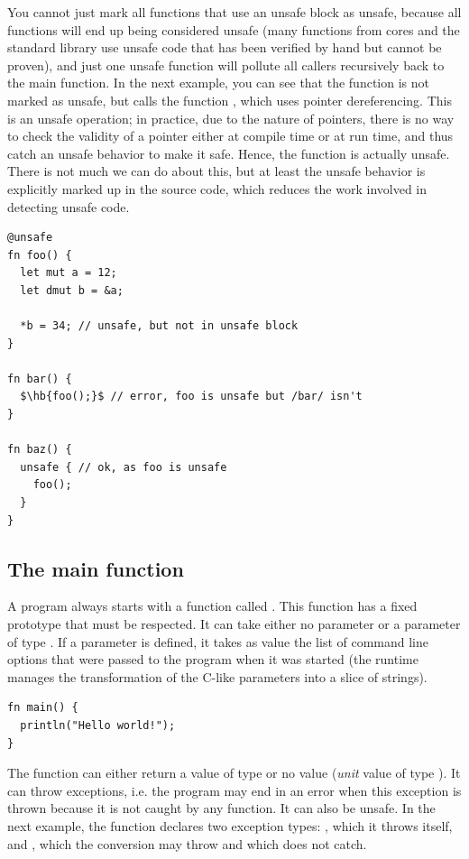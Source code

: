 You cannot just mark all functions that use an unsafe block as unsafe, because
all functions will end up being considered unsafe (many functions from cores and
the standard library use unsafe code that has been verified by hand but cannot
be proven), and just one unsafe function will pollute all callers recursively
back to the main function. In the next example, you can see that the function
 is not marked as unsafe, but calls the function , which
uses pointer dereferencing. This is an unsafe operation; in practice, due to the
nature of pointers, there is no way to check the validity of a pointer either at
compile time or at run time, and thus catch an unsafe behavior to make it safe.
Hence, the  function is actually unsafe. There is not much we can do
about this, but at least the unsafe behavior is explicitly marked up in the
source code, which reduces the work involved in detecting unsafe code.

\begin{lstlisting}[style=coloredverbatimError, escapechar=$]
@unsafe
fn foo() {
  let mut a = 12;
  let dmut b = &a;

  *b = 34; // unsafe, but not in unsafe block
}

fn bar() {
  $\hb{foo();}$ // error, foo is unsafe but /bar/ isn't
}

fn baz() {
  unsafe { // ok, as foo is unsafe
    foo();
  }
}
\end{lstlisting}

\subsection{The main function}

A program always starts with a function called . This function has
a fixed prototype that must be respected. It can take either no parameter or a
parameter of type \token{[[c8]]}. If a parameter is defined, it takes as value
the list of command line options that were passed to the program when it was
started (the runtime manages the transformation of the C-like parameters
 into a slice of strings).

\begin{lstlisting}[style=coloredverbatim, caption=The simplest main function prototype]
fn main() {
  println("Hello world!");
}
\end{lstlisting}

The function can either return a value of type  or no value
(\textit{unit} value of type ). It can throw exceptions, i.e. the
program may end in an error when this exception is thrown because it is not
caught by any function. It can also be unsafe. In the next example, the
 function declares two exception types: , which
it throws itself, and , which the conversion  may
throw and which  does not catch.

